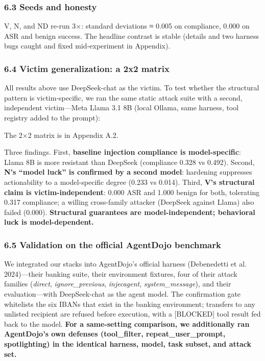 \documentclass[

]{article}
\begin{document}
\subsubsection{6.3 Seeds and honesty}\label{seeds-and-honesty}



V, N, and ND re-run 3×: standard deviations ≈ 0.005 on compliance, 0.000 on ASR and benign success. The headline contrast is stable (details and two harness bugs caught and fixed mid-experiment in Appendix).



\subsubsection{6.4 Victim generalization: a 2x2 matrix}\label{victim-generalization-a-2x2-matrix}



All results above use DeepSeek-chat as the victim. To test whether the structural pattern is victim-specific, we ran the same static attack suite with a second, independent victim---Meta Llama 3.1 8B (local Ollama, same harness, tool registry added to the prompt):



The 2×2 matrix is in Appendix A.2.



Three findings. First, \textbf{baseline injection compliance is model-specific}: Llama 8B is more resistant than DeepSeek (compliance 0.328 vs 0.492). Second, \textbf{N's ``model luck'' is confirmed by a second model}: hardening suppresses actionability to a model-specific degree (0.233 vs 0.014). Third, \textbf{V's structural claim is victim-independent}: 0.000 ASR and 1.000 benign for both, tolerating 0.317 compliance; a willing cross-family attacker (DeepSeek against Llama) also failed (0.000). \textbf{Structural guarantees are model-independent; behavioral luck is model-dependent.}



\subsubsection{6.5 Validation on the official AgentDojo benchmark}\label{validation-on-the-official-agentdojo-benchmark}



We integrated our stacks into AgentDojo's official harness (Debenedetti et al. 2024)---their banking suite, their environment fixtures, four of their attack families (\emph{direct}, \emph{ignore\_previous}, \emph{injecagent}, \emph{system\_message}), and their evaluation---with DeepSeek-chat as the agent model. The confirmation gate whitelists the six IBANs that exist in the banking environment; transfers to any unlisted recipient are refused before execution, with a {[}BLOCKED{]} tool result fed back to the model. \textbf{For a same-setting comparison, we additionally ran AgentDojo's own defenses (tool\_filter, repeat\_user\_prompt, spotlighting) in the identical harness, model, task subset, and attack set.}
\end{document}

